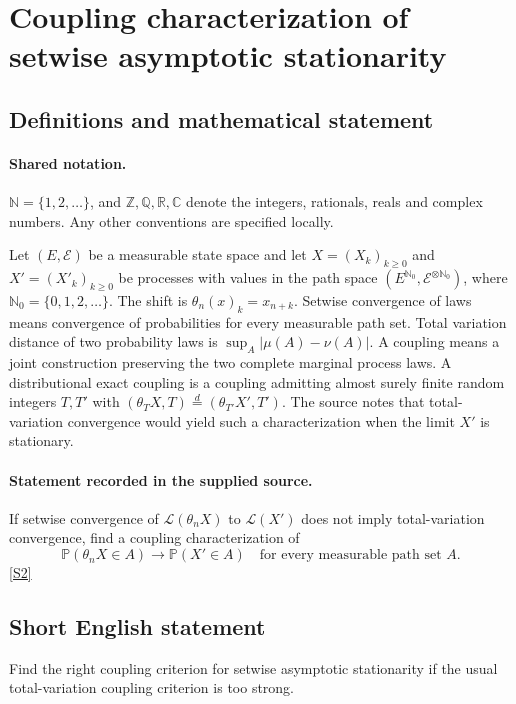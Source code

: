 \documentclass[11pt]{article}
\newcommand{\sref}[2]{\hyperlink{source:#1:#2}{[S#2]}}
\begin{document}
\section{Coupling characterization of setwise asymptotic stationarity}\label{statement}

\subsection{Definitions and mathematical statement}

\paragraph{Shared notation.}$\mathbb N=\{1,2,\ldots\}$, and $\mathbb Z,\mathbb Q,\mathbb R,\mathbb C$ denote the integers, rationals, reals and complex numbers. Any other conventions are specified locally.


Let $(E,\mathcal E)$ be a measurable state space and let $X=(X_k)_{k\ge0}$ and $X'=(X'_k)_{k\ge0}$ be processes with values in the path space $(E^{\mathbb N_0},\mathcal E^{\otimes\mathbb N_0})$, where $\mathbb N_0=\{0,1,2,\ldots\}$. The shift is $\theta_n(x)_k=x_{n+k}$. Setwise convergence of laws means convergence of probabilities for every measurable path set. Total variation distance of two probability laws is $\sup_A|\mu(A)-\nu(A)|$. A coupling means a joint construction preserving the two complete marginal process laws. A distributional exact coupling is a coupling admitting almost surely finite random integers $T,T'$ with $(\theta_TX,T)\stackrel d=(\theta_{T'}X',T')$. The source notes that total-variation convergence would yield such a characterization when the limit $X'$ is stationary.
\paragraph{Statement recorded in the supplied source.}
If setwise convergence of $\mathcal L(\theta_nX)$ to $\mathcal L(X')$ does not imply total-variation convergence, find a coupling characterization of
\[\mathbb P(\theta_nX\in A)\to\mathbb P(X'\in A)\quad\text{for every measurable path set }A.\] \sref{statement}{2}
\subsection{Short English statement}
Find the right coupling criterion for setwise asymptotic stationarity if the usual total-variation coupling criterion is too strong.
\end{document}
